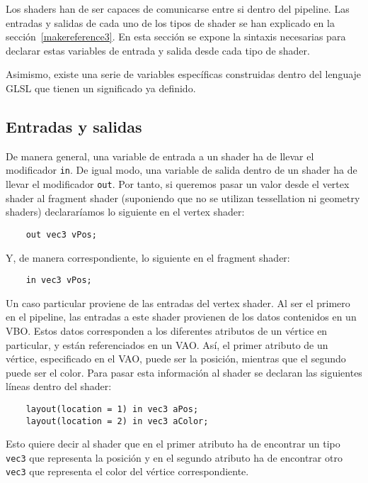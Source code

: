 Los shaders han de ser capaces de comunicarse entre si dentro del pipeline. Las
entradas y salidas de cada uno de los tipos de shader se han explicado en la
sección~\ref{makereference3}. En esta sección se expone la sintaxis necesarias
para declarar estas variables de entrada y salida desde cada tipo de shader.

Asimismo, existe una serie de variables específicas construidas dentro del
lenguaje GLSL que tienen un significado ya definido.

\subsection{Entradas y salidas}

De manera general, una variable de entrada a un shader ha  de llevar el
modificador \verb|in|. De igual modo, una variable de salida dentro de un shader
ha de llevar el modificador \verb|out|. Por tanto, si queremos pasar un valor
desde el vertex shader al fragment shader (suponiendo que no se utilizan
tessellation ni geometry shaders) declararíamos lo siguiente en el vertex shader:

\begin{verbatim}
    out vec3 vPos;	
\end{verbatim}

Y, de manera correspondiente, lo siguiente en el fragment shader:

\begin{verbatim}
    in vec3 vPos;	
\end{verbatim}

Un caso particular proviene de las entradas del vertex shader. Al ser el primero
en el pipeline, las entradas a este shader provienen de los datos contenidos en
un VBO. Estos datos corresponden a los diferentes atributos de un vértice en
particular, y están referenciados en un VAO. Así, el primer atributo de un
vértice, especificado en el VAO, puede ser la posición, mientras que el segundo
puede ser el color. Para pasar esta información al shader se declaran las
siguientes líneas dentro del shader:

\begin{verbatim}
    layout(location = 1) in vec3 aPos;		
    layout(location = 2) in vec3 aColor;		
\end{verbatim}

Esto quiere decir al shader que en el primer atributo ha de encontrar
un tipo \verb|vec3| que representa la posición y en el segundo atributo ha de
encontrar otro \verb|vec3| que representa el color del vértice correspondiente.

